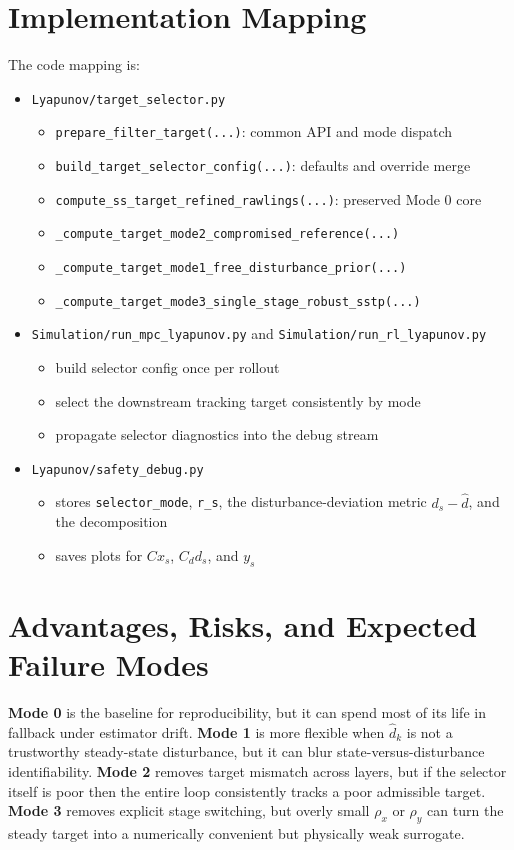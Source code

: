 \documentclass[11pt]{article}
\begin{document}
\section{Implementation Mapping}
The code mapping is:
\begin{itemize}
\item \texttt{Lyapunov/target\_selector.py}
  \begin{itemize}
  \item \texttt{prepare\_filter\_target(...)}: common API and mode dispatch
  \item \texttt{build\_target\_selector\_config(...)}: defaults and override merge
  \item \texttt{compute\_ss\_target\_refined\_rawlings(...)}: preserved Mode 0 core
  \item \texttt{\_compute\_target\_mode2\_compromised\_reference(...)}
  \item \texttt{\_compute\_target\_mode1\_free\_disturbance\_prior(...)}
  \item \texttt{\_compute\_target\_mode3\_single\_stage\_robust\_sstp(...)}
  \end{itemize}
\item \texttt{Simulation/run\_mpc\_lyapunov.py} and \texttt{Simulation/run\_rl\_lyapunov.py}
  \begin{itemize}
  \item build selector config once per rollout
  \item select the downstream tracking target consistently by mode
  \item propagate selector diagnostics into the debug stream
  \end{itemize}
\item \texttt{Lyapunov/safety\_debug.py}
  \begin{itemize}
  \item stores \texttt{selector\_mode}, \texttt{r\_s}, the disturbance-deviation metric $d_s-\hat d$, and the decomposition
  \item saves plots for $C x_s$, $C_d d_s$, and $y_s$
  \end{itemize}
\end{itemize}

\section{Advantages, Risks, and Expected Failure Modes}
\textbf{Mode 0} is the baseline for reproducibility, but it can spend most of its life in fallback under estimator drift. \textbf{Mode 1} is more flexible when $\hat d_k$ is not a trustworthy steady-state disturbance, but it can blur state-versus-disturbance identifiability. \textbf{Mode 2} removes target mismatch across layers, but if the selector itself is poor then the entire loop consistently tracks a poor admissible target. \textbf{Mode 3} removes explicit stage switching, but overly small $\rho_x$ or $\rho_y$ can turn the steady target into a numerically convenient but physically weak surrogate.
\end{document}
